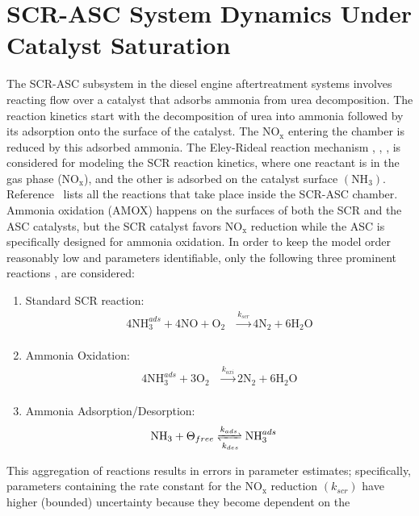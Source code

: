 \documentclass[subscriptcorrection,upint,varvw,barcolor=Goldenrod3,mathalfa=cal=euler,balance,hyphenate,french,pdf-a]{asmejour}
\newcommand{\lr}[1]{\left( #1 \right)}
\newcommand{\nox}{\text{NO}_{\text{x}}}
\newcommand{\ammonia}{\text{NH}_{3}}
\newcommand{\oxygen}{\text{O}_{2}}
\newcommand{\water}{\text{H}_{2}\text{O}}
\newcommand{\nitrogen}{\text{N}_{2}}
\begin{document}
\section{SCR-ASC System Dynamics Under Catalyst Saturation}
The SCR-ASC subsystem in the diesel engine aftertreatment systems involves reacting flow over a catalyst that
adsorbs ammonia from urea decomposition. The reaction kinetics start with the decomposition of urea into ammonia
followed by its adsorption onto the surface of the catalyst. The $\nox$ entering the chamber is reduced by this adsorbed
ammonia. The Eley-Rideal reaction mechanism \cite{prins2018eley}, \cite{yuan2015diesel}, \cite{hsieh2011development},
\cite{nova2014urea} is considered for modeling the SCR reaction kinetics, where one reactant is in the gas phase ($\nox$), and
the other is adsorbed on the catalyst surface $(\ammonia)$. Reference~\cite{nova2014urea} lists all the reactions that take place
inside the SCR-ASC chamber. Ammonia oxidation (AMOX) happens on the surfaces of both the SCR and the ASC
catalysts, but the SCR catalyst favors $\nox$ reduction while the ASC is specifically designed for ammonia oxidation.
In order to keep the model order reasonably low and parameters identifiable, only the following three prominent reactions \cite{devarakonda2008adequacy},\cite{hsieh2011development} are considered:
\begin{enumerate}
    \item Standard SCR reaction:
    \begin{align}
        4 \ammonia ^{ads} + 4 \text{NO} + \oxygen &\xrightarrow[]{k_{scr}} 4 \nitrogen + 6 \water \label{eqn::std_scr}
    \end{align}
    \item Ammonia Oxidation:
    \begin{align}
        4 \ammonia^{ads} + 3 \oxygen &\xrightarrow[]{k_{oxi}} 2 \nitrogen + 6 \water \label{eqn::amox}
    \end{align}
    \item Ammonia Adsorption/Desorption:
        \begin{align}
            \ammonia + \Theta_{free} &\xrightleftharpoons[k_{des}]{k_{ads}} \ammonia^{ads}
            \label{eqn::ads}
        \end{align}
\end{enumerate}
This aggregation of reactions results in errors in parameter estimates; specifically, parameters containing the rate
constant for the $\nox$ reduction $\lr{k_{scr}}$ have higher (bounded) uncertainty because they become dependent on the
\end{document}
